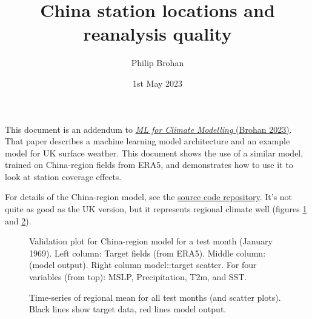 \documentclass[a4paper,12pt]{article}
\title{China station locations and reanalysis quality}
\author{Philip Brohan}
\date{1st May 2023}
\begin{document}
 
\maketitle

This document is an addendum to \href{https://metoffice.sharepoint.com/:b:/r/sites/csspchinaext/MO%20Outputs%20Upload/WP1/Papers/D1.6.3_Brohan_ML_for_climate_modelling.pdf?csf=1&web=1&e=G4ypno}{{\it ML for Climate Modelling} (Brohan 2023)}. That paper describes a machine learning model architecture and an example model for UK surface weather. This document shows the use of a similar model, trained on China-region fields from ERA5, and demonstrates how to use it to look at station coverage effects.

For details of the China-region model, see the \href{https://github.com/philip-brohan/ML_monthly_China}{source code repository}. It's not quite as good as the UK version, but it represents regional climate well (figures \ref{Validation} and \ref{Validation_multi}).

\begin{figure}[h]
\caption{Validation plot for China-region model for a test month (January 1969). Left column: Target fields (from ERA5). Middle column: (model output). Right column model::target scatter. For four variables (from top): MSLP, Precipitation, T2m, and SST.}
\label{Validation}
\end{figure}

\begin{figure}[h]
\caption{Time-series of regional mean for all test months (and scatter plots). Black lines show target data, red lines model output.}
\label{Validation_multi}
\end{figure}
    
\end{document}
